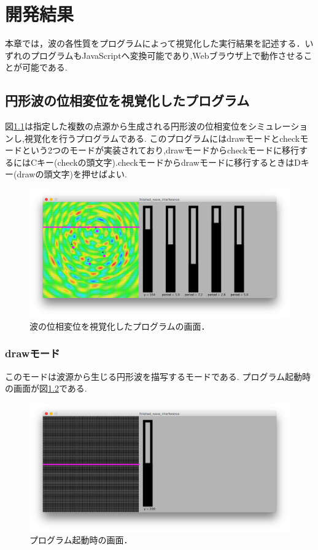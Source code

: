 \chapter{開発結果}
本章では，波の各性質をプログラムによって視覚化した実行結果を記述する．いずれのプログラムもJavaScriptへ変換可能であり,Webブラウザ上で動作させることが可能である.

\section{円形波の位相変位を視覚化したプログラム}
図\ref{fig:4wave}は指定した複数の点源から生成される円形波の位相変位をシミュレーションし,視覚化を行うプログラムである.
このプログラムにはdrawモードとcheckモードという2つのモードが実装されており,drawモードからcheckモードに移行するにはCキー(checkの頭文字).checkモードからdrawモードに移行するときはDキー(drawの頭文字)を押せばよい.


\begin{figure}[htbp]
 \begin{center}
  \includegraphics[width=\linewidth]{../result/4wave.png}
 \end{center}
 \caption{波の位相変位を視覚化したプログラムの画面．}
 \label{fig:4wave}
\end{figure}






\subsection{drawモード}
このモードは波源から生じる円形波を描写するモードである. プログラム起動時の画面が図\ref{fig:0wave}である.
\begin{figure}[htbp]
 \begin{center}
  \includegraphics[width=\linewidth]{../result/0wave.png}
 \end{center}
 \caption{プログラム起動時の画面．}
 \label{fig:0wave}
\end{figure}

